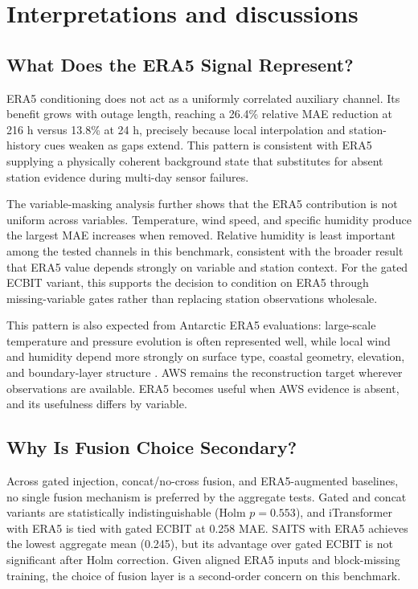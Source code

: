 \section{Interpretations and discussions}

\subsection{What Does the ERA5 Signal Represent?}
ERA5 conditioning does not act as a uniformly correlated auxiliary channel. Its benefit grows with outage length, reaching a 26.4\% relative MAE reduction at 216 h versus 13.8\% at 24 h, precisely because local interpolation and station-history cues weaken as gaps extend. This pattern is consistent with ERA5 supplying a physically coherent background state that substitutes for absent station evidence during multi-day sensor failures.

The variable-masking analysis further shows that the ERA5 contribution is not uniform across variables. Temperature, wind speed, and specific humidity produce the largest MAE increases when removed. Relative humidity is least important among the tested channels in this benchmark, consistent with the broader result that ERA5 value depends strongly on variable and station context. For the gated ECBIT variant, this supports the decision to condition on ERA5 through missing-variable gates rather than replacing station observations wholesale.

This pattern is also expected from Antarctic ERA5 evaluations: large-scale temperature and pressure evolution is often represented well, while local wind and humidity depend more strongly on surface type, coastal geometry, elevation, and boundary-layer structure \citep{zhu2021era5antarctica,tetzner2019era5antarcticpeninsula,catonharrison2022antarcticwinds,rakoczy2026era5winds}. AWS remains the reconstruction target wherever observations are available. ERA5 becomes useful when AWS evidence is absent, and its usefulness differs by variable.

\subsection{Why Is Fusion Choice Secondary?}
Across gated injection, concat/no-cross fusion, and ERA5-augmented baselines, no single fusion mechanism is preferred by the aggregate tests. Gated and concat variants are statistically indistinguishable (Holm $p=0.553$), and iTransformer with ERA5 is tied with gated ECBIT at 0.258 MAE. SAITS with ERA5 achieves the lowest aggregate mean (0.245), but its advantage over gated ECBIT is not significant after Holm correction. Given aligned ERA5 inputs and block-missing training, the choice of fusion layer is a second-order concern on this benchmark.

